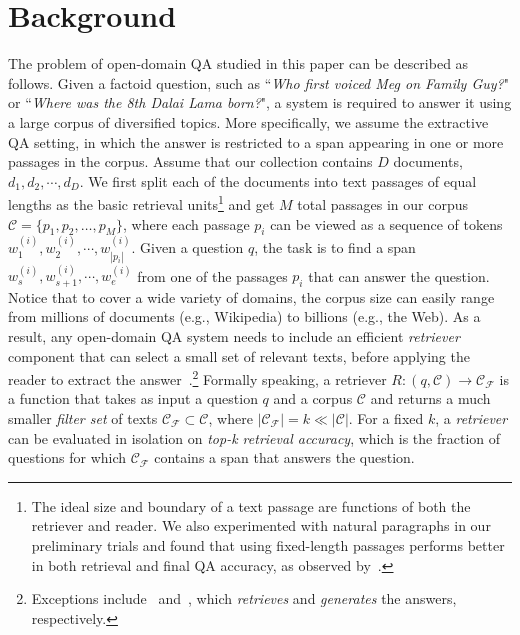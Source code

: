 
\section{Background}
\label{sec:background}



The problem of open-domain QA studied in this paper can be described as follows.  Given a factoid question, such as
``\emph{Who first voiced Meg on Family Guy?}" or ``\emph{Where was the 8th Dalai Lama born?}", a system is required
to answer it using a large corpus of diversified topics.
More specifically, we assume the extractive QA setting, in which the answer is restricted to a span appearing in one or more passages in the corpus.
Assume that our collection contains $D$ documents, $d_1, d_2, \cdots, d_D$.
We first split each of the documents into text passages of equal lengths as the basic retrieval units\footnote{The ideal size and boundary of a text passage are functions of both the retriever and reader. We also experimented with natural paragraphs in our preliminary trials and found that using fixed-length passages performs better in both retrieval and final QA accuracy, as observed by~\citet{wang2019multi}.}
and get $M$ total passages in our corpus $\mathcal{C} = \{p_1, p_2, \ldots, p_{M}\}$, where
each passage $p_i$ can be viewed as a sequence of tokens $w^{(i)}_1, w^{(i)}_2, \cdots, w^{(i)}_{|p_i|}$.
Given a question $q$, the task is to find a span $w^{(i)}_s, w^{(i)}_{s+1}, \cdots, w^{(i)}_{e}$
from one of the passages $p_i$ that can answer the question.
Notice that %
to cover a wide variety of domains, the corpus size %
can easily range from millions of documents (e.g., Wikipedia) to billions (e.g., the Web).
As a result, any open-domain QA system needs to include an efficient \emph{retriever} component that
can select a small set of relevant texts, before applying the reader to extract the answer~\cite{chen2017reading}.\footnote{Exceptions include~\cite{seo2019real} and~\cite{roberts2020much}, which \emph{retrieves} and \emph{generates} the answers, respectively.}
Formally speaking, a retriever $R:(q,\mathcal{C}) \rightarrow \mathcal{C_F}$ is a function that takes as input a question $q$ and a corpus $\mathcal{C}$ and returns
a much smaller \emph{filter set} of texts $\mathcal{C_F} \subset \mathcal{C}$, where $|\mathcal{C_F}| = k \ll |\mathcal{C}|$.  For a fixed $k$, a \emph{retriever} can be evaluated in isolation on \emph{top-k retrieval accuracy}, which is the fraction of questions for which $\mathcal{C_F}$ contains a span that answers the question.



